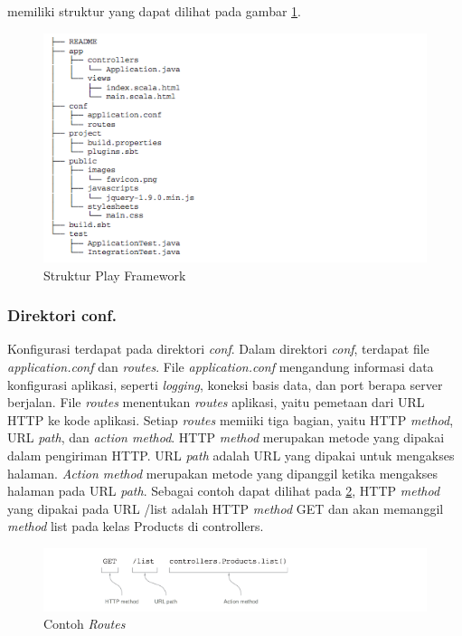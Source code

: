 \play memiliki struktur yang dapat dilihat pada gambar \ref{fig:2_play_struktur}.

\begin{figure}[H]
	\centering
	\includegraphics[scale=0.7]{Gambar/play-struktur}
	\caption{Struktur Play Framework} 
	\label{fig:2_play_struktur}
\end{figure}

\subsubsection{Direktori conf.}
Konfigurasi \play terdapat pada direktori \textit{conf}. Dalam direktori \textit{conf}, terdapat file \textit{application.conf} dan \textit{routes}. File \textit{application.conf} mengandung informasi data konfigurasi aplikasi, seperti \textit{logging}, koneksi basis data, dan port berapa server berjalan. File \textit{routes} menentukan \textit{routes} aplikasi, yaitu pemetaan dari URL HTTP ke kode aplikasi. Setiap \textit{routes} memiiki tiga bagian, yaitu HTTP \textit{method}, URL \textit{path}, dan \textit{action method}. HTTP \textit{method} merupakan metode yang dipakai dalam pengiriman HTTP. URL \textit{path} adalah URL yang dipakai untuk mengakses halaman. \textit{Action method} merupakan metode  yang dipanggil ketika mengakses halaman pada URL \textit{path}. Sebagai contoh dapat dilihat pada \ref{fig:2_play_routes}, HTTP \textit{method} yang dipakai pada URL /list adalah HTTP \textit{method} GET dan akan memanggil \textit{method} list pada kelas Products di controllers.

\begin{figure}[H]
	\centering
	\includegraphics[scale=0.7]{Gambar/play-routes}
	\caption{Contoh \textit{Routes}} 
	\label{fig:2_play_routes}
\end{figure}

